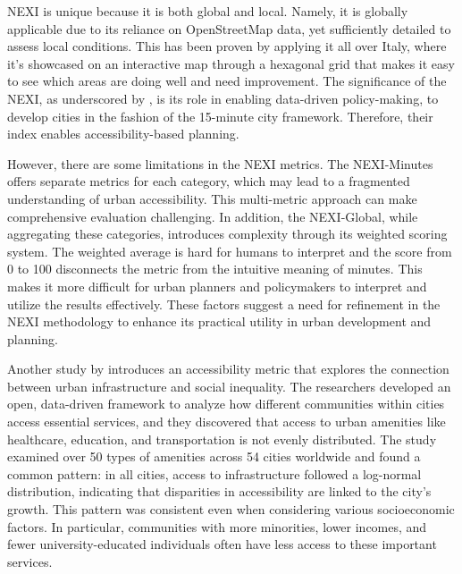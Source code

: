 NEXI is unique because it is both global and local. 
Namely, it is globally applicable due to its reliance on OpenStreetMap data, yet sufficiently detailed to assess local conditions.
This has been proven by applying it all over Italy, where it's showcased on an interactive map through a hexagonal grid that makes it easy to see which areas are doing well and need improvement.
The significance of the NEXI, as underscored by , is its role in enabling data-driven policy-making, to develop cities in the fashion of the 15-minute city framework. 
Therefore, their index enables accessibility-based planning.

However, there are some limitations in the NEXI metrics. 
The NEXI-Minutes offers separate metrics for each category, which may lead to a fragmented understanding of urban accessibility. 
This multi-metric approach can make comprehensive evaluation challenging. 
In addition, the NEXI-Global, while aggregating these categories, introduces complexity through its weighted scoring system. 
The weighted average is hard for humans to interpret and the score from 0 to 100 disconnects the metric from the intuitive meaning of minutes.
This makes it more difficult for urban planners and policymakers to interpret and utilize the results effectively. 
These factors suggest a need for refinement in the NEXI methodology to enhance its practical utility in urban development and planning.


Another study by  introduces an accessibility metric that explores the connection between urban infrastructure and social inequality. 
The researchers developed an open, data-driven framework to analyze how different communities within cities access essential services, and they discovered that access to urban amenities like healthcare, education, and transportation is not evenly distributed. 
The study examined over 50 types of amenities across 54 cities worldwide and found a common pattern: in all cities, access to infrastructure followed a log-normal distribution, indicating that disparities in accessibility are linked to the city's growth. 
This pattern was consistent even when considering various socioeconomic factors.
In particular, communities with more minorities, lower incomes, and fewer university-educated individuals often have less access to these important services.

